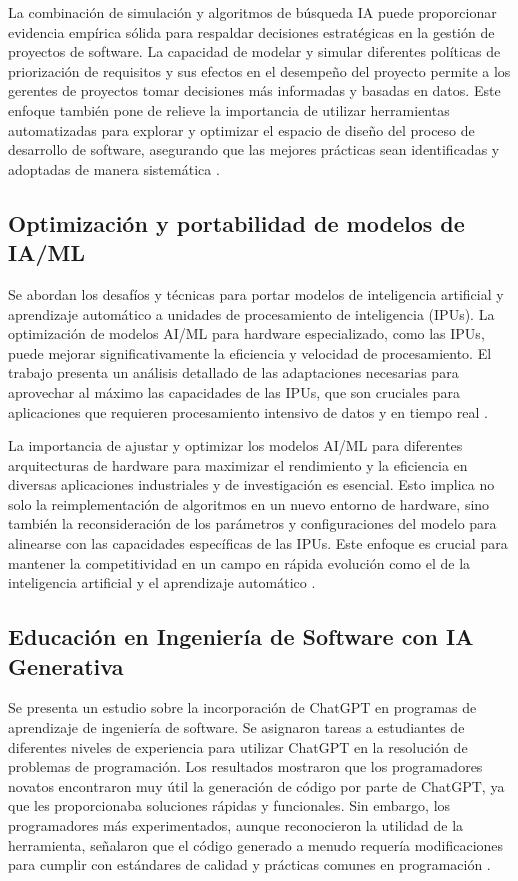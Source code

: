 La combinación de simulación y algoritmos de búsqueda IA puede proporcionar evidencia empírica sólida para respaldar decisiones estratégicas en la gestión de proyectos de software. La capacidad de modelar y simular diferentes políticas de priorización de requisitos y sus efectos en el desempeño del proyecto permite a los gerentes de proyectos tomar decisiones más informadas y basadas en datos. Este enfoque también pone de relieve la importancia de utilizar herramientas automatizadas para explorar y optimizar el espacio de diseño del proceso de desarrollo de software, asegurando que las mejores prácticas sean identificadas y adoptadas de manera sistemática \cite{Lemon2009}.

\subsection{Optimización y portabilidad de modelos de IA/ML}

Se abordan los desafíos y técnicas para portar modelos de inteligencia artificial y aprendizaje automático a unidades de procesamiento de inteligencia (IPUs). La optimización de modelos AI/ML para hardware especializado, como las IPUs, puede mejorar significativamente la eficiencia y velocidad de procesamiento. El trabajo presenta un análisis detallado de las adaptaciones necesarias para aprovechar al máximo las capacidades de las IPUs, que son cruciales para aplicaciones que requieren procesamiento intensivo de datos y en tiempo real \cite{Nasari2023}.

La importancia de ajustar y optimizar los modelos AI/ML para diferentes arquitecturas de hardware para maximizar el rendimiento y la eficiencia en diversas aplicaciones industriales y de investigación es esencial. Esto implica no solo la reimplementación de algoritmos en un nuevo entorno de hardware, sino también la reconsideración de los parámetros y configuraciones del modelo para alinearse con las capacidades específicas de las IPUs. Este enfoque es crucial para mantener la competitividad en un campo en rápida evolución como el de la inteligencia artificial y el aprendizaje automático \cite{Nasari2023}.

\subsection{Educación en Ingeniería de Software con IA Generativa}

Se presenta un estudio sobre la incorporación de ChatGPT en programas de aprendizaje de ingeniería de software. Se asignaron tareas a estudiantes de diferentes niveles de experiencia para utilizar ChatGPT en la resolución de problemas de programación. Los resultados mostraron que los programadores novatos encontraron muy útil la generación de código por parte de ChatGPT, ya que les proporcionaba soluciones rápidas y funcionales. Sin embargo, los programadores más experimentados, aunque reconocieron la utilidad de la herramienta, señalaron que el código generado a menudo requería modificaciones para cumplir con estándares de calidad y prácticas comunes en programación \cite{Petrovska2023}.

